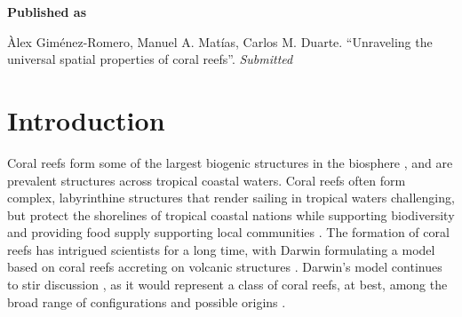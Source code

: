 \vspace{3cm}





\textbf{Published as}

\vspace{0.5cm}

\begin{center}
    Àlex Giménez-Romero, Manuel A. Matías, Carlos M. Duarte. ``Unraveling the
    universal spatial properties of coral reefs''. \textit{Submitted}
\end{center}


\newpage
\section{Introduction}

Coral reefs form some of the largest biogenic structures in the biosphere
\cite{wiener2021exploration}, and are prevalent structures across tropical
coastal waters. Coral reefs often form complex, labyrinthine structures that
render sailing in tropical waters challenging, but protect the shorelines of
tropical coastal nations while supporting biodiversity and providing food
supply supporting local communities \cite{Moberg1999}. The formation of coral
reefs has intrigued scientists for a long time, with Darwin formulating a model
based on coral reefs accreting on volcanic structures
\cite{darwin1874structure}. Darwin's model continues to stir discussion
\cite{Droxler2021}, as it would represent a class of coral reefs, at best,
among the broad range of configurations and possible origins
\cite{Scoffin1983}.


